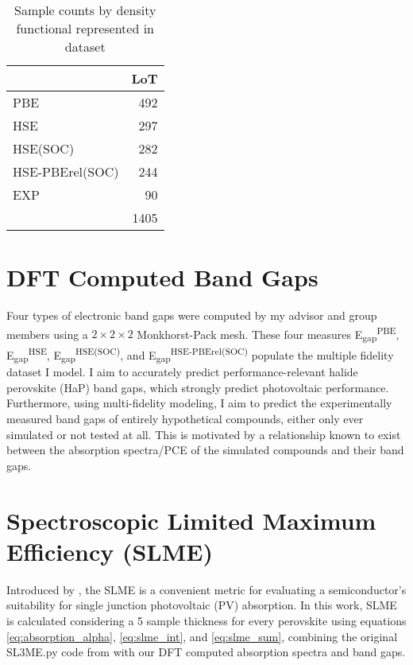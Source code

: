  
\begin{table}[htbp]
\caption{\label{tbl:LoTs} Sample counts by density functional represented in dataset}
\centering
\begin{tabular}{lr}
 & LoT\\[0pt]
\hline
PBE & 492\\[0pt]
HSE & 297\\[0pt]
HSE(SOC) & 282\\[0pt]
HSE-PBErel(SOC) & 244\\[0pt]
EXP & 90\\[0pt]
\hline
 & 1405\\[0pt]
\end{tabular}
\end{table}

\section{DFT Computed Band Gaps}
\label{sec:org04d6187}
Four types of electronic band gaps were computed by my advisor and group members using a \(2\times{}2\times{}2\) Monkhorst-Pack mesh.
These four measures E\textsubscript{gap}\textsuperscript{PBE}, E\textsubscript{gap}\textsuperscript{HSE}, E\textsubscript{gap}\textsuperscript{HSE(SOC)}, and E\textsubscript{gap}\textsuperscript{HSE-PBErel(SOC)} populate the multiple fidelity dataset I model.
I aim to accurately predict performance-relevant halide perovskite (HaP) band gaps, which strongly predict photovoltaic performance.
\autocite{mannodi-kanakkithodi-2019-compr-comput}
Furthermore, using multi-fidelity modeling, I aim to predict the experimentally measured band gaps of entirely hypothetical compounds, either only ever simulated or not tested at all.
This is motivated by a relationship known to exist between the absorption spectra/PCE of the simulated compounds and their band gaps.

\section{Spectroscopic Limited Maximum Efficiency (SLME)}
\label{sec:orgb6f9213}
Introduced by \textcite{yu-2012-ident-poten}, the SLME is a convenient metric for evaluating a semiconductor's suitability for single junction photovoltaic (PV) absorption.
In this work, SLME is calculated considering a 5\units{\micro\meter} sample thickness for every perovskite using equations \ref{eq:absorption_alpha}, \ref{eq:slme_int}, and \ref{eq:slme_sum}, combining the original SL3ME.py code from \textcite{yu-2012-ident-poten} with our DFT computed absorption spectra and band gaps.

